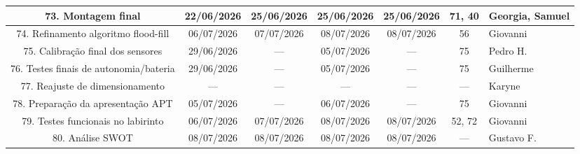 \begin{landscape}
\begin{center}
\begin{longtable}{|c|c|c|c|c|c|p{3.6cm}|}
73. Montagem final & 22/06/2026 & 25/06/2026 & 25/06/2026 & 25/06/2026 & 71, 40 & Georgia, Samuel \\ \hline
74. Refinamento algoritmo flood-fill & 06/07/2026 & 07/07/2026 & 08/07/2026 & 08/07/2026 & 56 & Giovanni \\ \hline
75. Calibração final dos sensores & 29/06/2026 & --- & 05/07/2026 & --- & 75 & Pedro H. \\ \hline
76. Testes finais de autonomia/bateria & 29/06/2026 & --- & 05/07/2026 & --- & 75 & Guilherme \\ \hline
77. Reajuste de dimensionamento & --- & --- & --- & --- & --- & Karyne \\ \hline
78. Preparação da apresentação APT & 05/07/2026 & --- & 06/07/2026 & --- & 75 & Giovanni \\ \hline
79. Testes funcionais no labirinto & 06/07/2026 & 07/07/2026 & 08/07/2026 & 08/07/2026 & 52, 72 & Giovanni \\ \hline
80. Análise SWOT & 08/07/2026 & 08/07/2026 & 08/07/2026 & 08/07/2026 & --- & Gustavo F. \\ \hline


\end{longtable}
\renewcommand{\arraystretch}{1}
\normalsize
\end{center}


\end{landscape}
